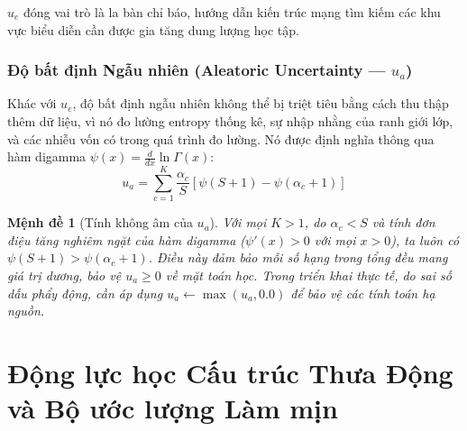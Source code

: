\documentclass[11pt, a4paper]{article}
\newtheorem{proposition}{Mệnh đề}
\begin{document}
$u_e$ đóng vai trò là la bàn chỉ báo, hướng dẫn kiến trúc mạng tìm kiếm các khu vực biểu diễn cần được gia tăng dung lượng học tập.

\subsubsection{Độ bất định Ngẫu nhiên (Aleatoric Uncertainty --- $u_a$)}

Khác với $u_e$, độ bất định ngẫu nhiên không thể bị triệt tiêu bằng cách thu thập thêm dữ liệu, vì nó đo lường entropy thống kê, sự nhập nhằng của ranh giới lớp, và các nhiễu vốn có trong quá trình đo lường. Nó được định nghĩa thông qua hàm digamma $\psi(x) = \frac{d}{dx}\ln\Gamma(x)$:
\begin{equation}\label{eq:u_a}
    u_a = \sum_{c=1}^K \frac{\alpha_c}{S} \left[\psi(S + 1) - \psi(\alpha_c + 1)\right]
\end{equation}

\begin{proposition}[Tính không âm của $u_a$]
Với mọi $K > 1$, do $\alpha_c < S$ và tính đơn điệu tăng nghiêm ngặt của hàm digamma ($\psi'(x) > 0$ với mọi $x > 0$), ta luôn có $\psi(S + 1) > \psi(\alpha_c + 1)$. Điều này đảm bảo mỗi số hạng trong tổng đều mang giá trị dương, bảo vệ $u_a \ge 0$ về mặt toán học. Trong triển khai thực tế, do sai số dấu phẩy động, cần áp dụng $u_a \leftarrow \max(u_a, 0.0)$ để bảo vệ các tính toán hạ nguồn.
\end{proposition}

\section{Động lực học Cấu trúc Thưa Động và Bộ ước lượng Làm mịn}\label{sec:sparse}
\end{document}
